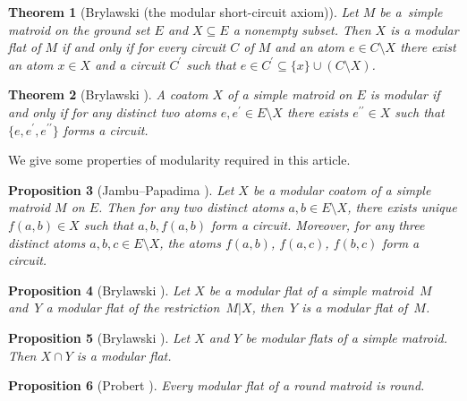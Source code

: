 \documentclass[11pt]{article}
\newtheorem{Theorem}{Theorem}[section]
\newtheorem{Proposition}[Theorem]{Proposition}
 { \theoremstyle{definition}
\newtheorem{Definition}[Theorem]{Definition}
\newtheorem{Example}[Theorem]{Example}
\newtheorem{Remark}[Theorem]{Remark}
\newtheorem{Question}[Theorem]{Question} }
\begin{document}
\begin{Theorem}[Brylawski {\cite[Theorem 3.11]{brylawski1975modular-totams}} (the modular short-circuit axiom)]\label{Brylawsky modular short-circuit axiom}
Let $ M $ be a~simple matroid on the ground set $ E $ and $ X \subseteq E $ a nonempty subset.
Then $ X $ is a modular flat of $ M $ if and only if for every circuit $ C $ of $ M $ and an atom $ e \in C \setminus X $ there exist an atom $ x \in X $ and a circuit $ C^{\prime} $ such that $ e \in C^{\prime} \subseteq \{x\} \cup (C \setminus X) $.
\end{Theorem}

\begin{Theorem}[{Brylawski \cite[Corollary 3.4]{brylawski1975modular-totams}}]\label{Brylawski modular coatom}
A coatom $ X $ of a simple matroid on $ E $ is modular if and only if for any distinct two atoms $ e, e^{\prime} \in E\setminus X $ there exists $ e^{\prime\prime} \in X $ such that $ \{e,e^{\prime},e^{\prime\prime}\} $ forms a circuit.
\end{Theorem}

We give some properties of modularity required in this article.
\begin{Proposition}[{Jambu--Papadima \cite[Lemmas~1.3 and~1.9]{jambu1998generalization-t}}]\label{Jambu-Papadima}
Let $ X $ be a modular coatom of a simple matroid $ M $ on $ E $. Then for any two distinct atoms $a,b \in E\setminus X $, there exists unique $ f(a,b) \in X $ such that $ a,b,f(a,b) $ form a circuit.
Moreover, for any three distinct atoms $ a,b,c \in E\setminus X $, the atoms $ f(a,b)$, $f(a,c)$, $f(b,c) $ form a circuit.
\end{Proposition}

\begin{Proposition}[Brylawski {\cite[Proposition 3.5]{brylawski1975modular-totams}}]\label{Brylawski modular tower}
Let $ X $ be a modular flat of a simple matroid~$ M $ and~$ Y $ a modular flat of the restriction~$ M|X $, then~$ Y $ is a modular flat of~$ M $.
\end{Proposition}

\begin{Proposition}[Brylawski {\cite[Proposition~3.6]{brylawski1975modular-totams}}]\label{Brylawski modular intersection}
Let $ X $ and $ Y $ be modular flats of a simple matroid.
Then $ X \cap Y $ is a modular flat.
\end{Proposition}

\begin{Proposition}[Probert {\cite[Corollary 4.2.8]{probert2018chordality}}]\label{Probert}
Every modular flat of a round matroid is round.
\end{Proposition}
\end{document}
